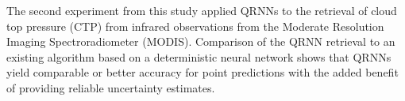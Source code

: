 %
%

The second experiment from this study applied QRNNs to the retrieval of cloud
top pressure (CTP) from infrared observations from the Moderate Resolution
Imaging Spectroradiometer (MODIS). Comparison of the QRNN retrieval to an
existing algorithm based on a deterministic neural network shows that QRNNs
yield comparable or better accuracy for point predictions with the added benefit
of providing reliable uncertainty estimates.


